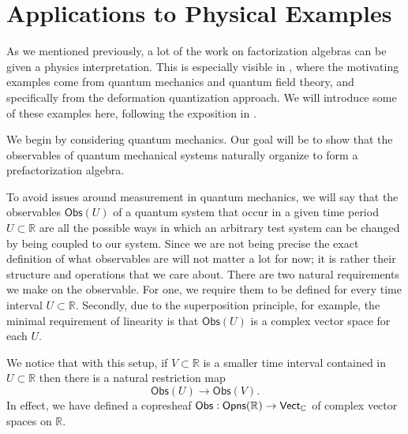 \documentclass[../text]{subfiles}
\begin{document}
\section{Applications to Physical Examples}\label{ch:physics}

As we mentioned previously, a lot of the work on factorization algebras can be given a physics interpretation. This is especially visible in \cite{cg2016}, where the motivating examples come from quantum mechanics and quantum field theory, and specifically from the deformation quantization approach. We will introduce some of these examples here, following the exposition in \cite{cg2016}.


\begin{example}\label{ex:barebones_qm}
    We begin by considering quantum mechanics. Our goal will be to show that the observables of quantum mechanical systems naturally organize to form a prefactorization algebra.

    To avoid issues around measurement in quantum mechanics, we will say that the observables $\mathsf{Obs}(U)$ of a quantum system that occur in a given time period $U \subset \mathbb{R}$ are all the possible ways in which an arbitrary test system can be changed by being coupled to our system. Since we are not being precise the exact definition of what observables are will not matter a lot for now; it is rather their structure and operations that we care about. There are two natural requirements we make on the observable. For one, we require them to be defined for every time interval $U \subset \mathbb{R}$. Secondly, due to the superposition principle, for example, the minimal requirement of linearity is that $\mathsf{Obs}(U)$ is a complex vector space for each $U$.

    We notice that with this setup, if $V \subset \mathbb{R}$ is a smaller time interval contained in $U \subset \mathbb{R}$ then there is a natural restriction map
    \begin{equation}
        \mathsf{Obs} (U) \rightarrow \mathsf{Obs} (V).
    \end{equation}
    In effect, we have defined a copresheaf $\mathsf{Obs}: \opens[r](\mathbb{R}) \rightarrow \mathsf{Vect}_{\mathbb{C}}$ of complex vector spaces on $\mathbb{R}$.


\end{example}
\end{document}
